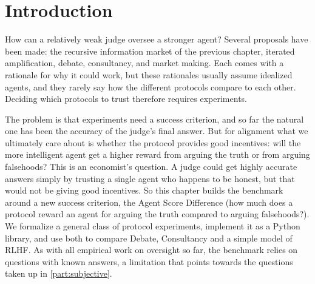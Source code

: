 \section{Introduction}\label{solib:sec:intro}
\begin{draftblock}
How can a relatively weak judge oversee a stronger agent? Several proposals have been made: the recursive information market of the previous chapter, iterated amplification, debate, consultancy, and market making. Each comes with a rationale for why it could work, but these rationales usually assume idealized agents, and they rarely say how the different protocols compare to each other. Deciding which protocols to trust therefore requires experiments.

The problem is that experiments need a success criterion, and so far the natural one has been the accuracy of the judge's final answer. But for alignment what we ultimately care about is whether the protocol provides good incentives: will the more intelligent agent get a higher reward from arguing the truth or from arguing falsehoods? This is an economist's question. A judge could get highly accurate answers simply by trusting a single agent who happens to be honest, but that would not be giving good incentives. So this chapter builds the benchmark around a new success criterion, the Agent Score Difference (how much does a protocol reward an agent for arguing the truth compared to arguing falsehoods?). We formalize a general class of protocol experiments, implement it as a Python library, and use both to compare Debate, Consultancy and a simple model of RLHF. As with all empirical work on oversight so far, the benchmark relies on questions with known answers, a limitation that points towards the questions taken up in \cref{part:subjective}.
\end{draftblock}






